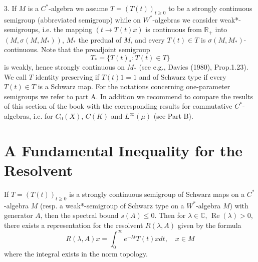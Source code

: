 3. If $M$ is a $C^{*}$-algebra we assume $T = (T(t))_{t \geq 0}$ to be a strongly continuous semigroup (abbreviated semigroup) while on $W^{*}$-algebras we consider weak*-semigroups, i.e. the mapping $(t \rightarrow T(t)x)$ is continuous from $\mathbb{R}_{+}$ into $(M, \sigma(M, M_{*}))$, $M_{*}$ the predual of $M$, and every $T(t) \in T$ is $\sigma(M, M_{*})$-continuous.
Note that the preadjoint semigroup
\[
T_{*} = \{T(t)_{*} : T(t) \in T\}
\]
is weakly, hence strongly continuous on $M_{*}$ (see e.g., Davies (1980), Prop.1.23).
We call $T$ identity preserving if $T(t)1 = 1$ and of Schwarz type if every $T(t) \in T$ is a Schwarz map.
For the notations concerning one-parameter semigroups we refer to part A.
In addition we recommend to compare the results of this section of the book with the corresponding results for commutative $C^{*}$-algebras, i.e. for $C_0(X)$, $C(K)$ and $L^\infty(\mu)$ (see Part B).

\section{A Fundamental Inequality for the Resolvent}

If $T=(T(t))_{t \geq 0}$ is a strongly continuous semigroup of Schwarz maps on a $C^{*}$-algebra $M$ (resp. a weak*-semigroup of Schwarz type on a $W^{*}$-algebra $M$) with generator $A$, then the spectral bound $s(A) \leq 0$.
Then for $\lambda \in \mathbb{C}$, $\operatorname{Re}(\lambda)>0$, there exists a representation for the resolvent $R(\lambda, A)$ given by the formula
\[
R(\lambda, A)x = \int_{0}^{\infty} e^{-\lambda t} T(t)x dt, \quad x \in M
\]
where the integral exists in the norm topology.

